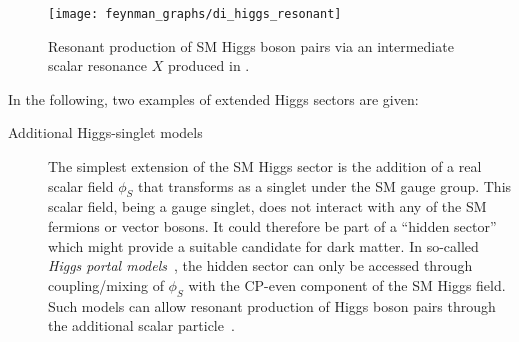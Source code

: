 \begin{figure}[htbp]
  \centering

  \texttt{[image: feynman\_graphs/di\_higgs\_resonant]}

  \caption{Resonant production of SM Higgs boson pairs via an intermediate
    scalar resonance $X$ produced in \ggF.}%
  \label{fig:resonant_production_feyn}
\end{figure}

In the following, two examples of extended Higgs sectors are given:
\begin{description}

\item[Additional Higgs-singlet models] The simplest extension of the SM Higgs
  sector is the addition of a real scalar field $\phi_{S}$ that transforms as a
  singlet under the SM gauge group. This scalar field, being a gauge singlet,
  does not interact with any of the SM fermions or vector bosons. It could
  therefore be part of a ``hidden sector'' which might provide a suitable
  candidate for dark matter. In so-called \emph{Higgs portal
    models}~\cite{Patt:2006fw}, the hidden sector can only be accessed through
  coupling/mixing of $\phi_{S}$ with the CP-even component of the SM Higgs
  field. Such models can allow resonant production of Higgs boson pairs through
  the additional scalar
  particle~\cite{Schabinger:2005ei,Bowen:2007ia,Barger:2007im,Dolan:2012ac,No:2013wsa,Chen:2014ask,Robens:2016xkb,DiMicco:2019ngk}.


\end{description}
